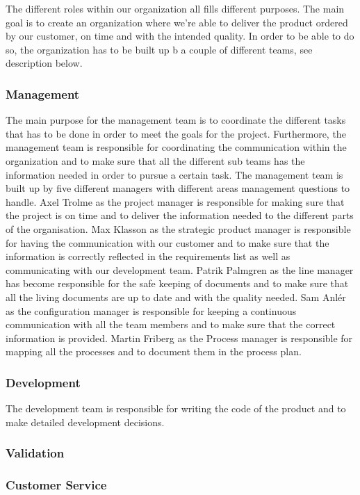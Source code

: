 The different roles within our organization all fills different purposes. The main goal is to create an organization where we're able to deliver the product ordered by our customer, on time and with the intended quality. In order to be able to do so, the organization has to be built up b a couple of different teams, see description below. 

\subsubsection{Management}
The main purpose for the management team is to coordinate the different tasks that has to be done in order to meet the goals for the project. Furthermore, the management team is responsible for coordinating the communication within the organization and to make sure that all the different sub teams has the information needed in order to pursue a certain task. The management team is built up by five different managers with different areas management questions to handle. Axel Trolme as the project manager is responsible for making sure that the project is on time and to deliver the information needed to the different parts of the organisation. Max Klasson as the strategic product manager is responsible for having the communication with our customer and to make sure that the information is correctly reflected in the requirements list as well as communicating with our development team. Patrik Palmgren as the line manager has become responsible for the safe keeping of documents and to make sure that all the living documents are up to date and with the quality needed. Sam Anlér as the configuration manager is responsible for keeping a continuous communication with all the team members and to make sure that the correct information is provided. Martin Friberg as the Process manager is responsible for mapping all the processes and to document them in the process plan. 

\subsubsection{Development}
The development team is responsible for writing the code of the product and to make detailed development decisions. 
\subsubsection{Validation}
\subsubsection{Customer Service}
